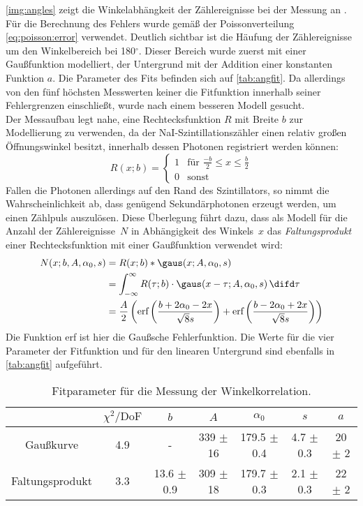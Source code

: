 \autoref{img:angles} zeigt die Winkelabhängkeit der Zählereignisse bei der Messung an \na.
Für die Berechnung des Fehlers wurde gemäß der Poissonverteilung \autoref{eq:poisson:error} verwendet.
Deutlich sichtbar ist die Häufung der Zählereignisse um den Winkelbereich bei 180$^\circ$.
Dieser Bereich wurde zuerst mit einer Gaußfunktion modelliert,
der Untergrund mit der Addition einer konstanten Funktion $a$.
Die Parameter des Fits befinden sich auf \autoref{tab:angfit}.
Da allerdings von den fünf höchsten Messwerten keiner die Fitfunktion innerhalb seiner Fehlergrenzen einschließt,
wurde nach einem besseren Modell gesucht.\\
Der Messaufbau legt nahe, eine Rechtecksfunktion $R$ mit Breite $b$ zur Modellierung zu verwenden,
da der NaI-Szintillationszähler einen relativ großen Öffnungswinkel besitzt,
innerhalb dessen Photonen registriert werden können:
\begin{equation}
  R(x;b) =
\begin{cases}
1 & \text{für }\frac{-b}{2} \leq x \leq \frac{b}{2}\\
0 & \text{sonst}
\end{cases}
\end{equation}
Fallen die Photonen allerdings auf den Rand des Szintillators,
so nimmt die Wahrscheinlichkeit ab, dass genügend Sekundärphotonen erzeugt werden,
um einen Zählpuls auszulösen.
Diese Überlegung führt dazu, dass als Modell für die Anzahl der Zählereignisse~$N$ in Abhängigkeit des Winkels~$x$
das \emph{Faltungsprodukt} einer Rechtecksfunktion mit einer
Gaußfunktion verwendet wird:
\begin{equation}
\begin{split}
  N(x;b,A,\alpha_0,s)&=R(x;b)*\gaus(x;A,\alpha_0,s)\\
  & = \int_{-\infty}^{\infty}{R(\tau;b) \cdot  \gaus(x-\tau;A,\alpha_0,s) \, \difd\tau}\\
  & =   \frac{A}{2} \left(\text{erf}\left(\frac{b+2 \alpha_0 -2 x}{\sqrt{8} s }\right)+
  \text{erf}\left(\frac{b-2 \alpha_0 +2 x}{\sqrt{8} s }\right)\right)
\end{split}
\end{equation}
Die Funktion erf ist hier die Gaußsche Fehlerfunktion.
Die Werte für die vier Parameter der Fitfunktion und für den linearen Untergrund sind ebenfalls
in \autoref{tab:angfit} aufgeführt.

\begin{table}[H]
\caption{Fitparameter für die Messung der Winkelkorrelation.}
\begin{center}
\begin{tabular}{|c|c|c|c|c|c|c|}
  \hline
   & $\chi^2 / \text{DoF}$ & $b$ & $A$ & $\alpha_0$ & $s$ & $a$ \\ \hline  
 Gaußkurve  & 4.9 & - & 339 $\pm$ 16 & 179.5 $\pm$ 0.4 & 4.7 $\pm$ 0.3 & 20 $\pm$ 2 \\ \hline  
 Faltungsprodukt & 3.3 & 13.6 $\pm$ 0.9 & 309 $\pm$ 18  & 179.7 $\pm$ 0.3 & 2.1 $\pm$ 0.3 & 22 $\pm$ 2 \\ \hline 
 
\end{tabular}
\end{center}
\label{tab:angfit}
\end{table}

